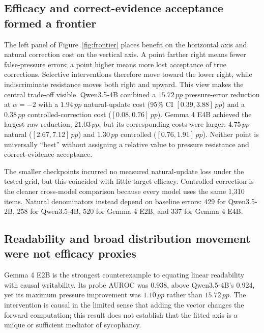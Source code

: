 \documentclass[11pt]{article}
\newcommand{\pp}{\,pp}
\begin{document}
\subsection{Efficacy and correct-evidence acceptance formed a frontier}
\label{sec:selectivity-results}

\begingroup
\let\paperoriginalfigure\figure
\let\paperoriginalendfigure\endfigure
\renewenvironment{figure}[1][]{\paperoriginalfigure[H]}{\paperoriginalendfigure}

\endgroup

The left panel of Figure~\ref{fig:frontier} places benefit on the horizontal
axis and natural correction cost on the vertical axis. A point farther right
means fewer false-pressure errors; a point higher means more lost acceptance of
true corrections. Selective interventions therefore move toward the lower
right, while indiscriminate resistance moves both right and upward. This view
makes the central trade-off visible.
Qwen3.5-4B combined a $15.72\pp$ pressure-error reduction at $\alpha=-2$ with a
$1.94\pp$ natural-update cost (95\% CI $[0.39,3.88]\pp$) and a $0.38\pp$
controlled-correction cost ($[0.08,0.76]\pp$). Gemma
4 E4B achieved the largest raw reduction, $21.03\pp$, but its corresponding
costs were larger: $4.75\pp$ natural ($[2.67,7.12]\pp$) and $1.30\pp$
controlled ($[0.76,1.91]\pp$). Neither point is
universally ``best'' without assigning a relative value to pressure resistance
and correct-evidence acceptance.

The smaller checkpoints incurred no measured natural-update loss under the tested
grid, but this coincided with little target efficacy. Controlled correction is
the cleaner cross-model comparison because every model uses the same 1,310
items. Natural denominators instead depend on baseline errors: 429 for
Qwen3.5-2B, 258 for Qwen3.5-4B, 520 for Gemma 4 E2B, and 337 for Gemma 4 E4B.

\subsection{Readability and broad distribution movement were not efficacy proxies}
\label{sec:diagnostic-results}

Gemma 4 E2B is the strongest counterexample to equating linear readability
with causal writability. Its probe AUROC was 0.938, above Qwen3.5-4B's 0.924,
yet its maximum pressure improvement was $1.10\pp$ rather than $15.72\pp$.
The intervention is causal in the limited sense that adding the vector changes
the forward computation; this result does not establish that the fitted axis is
a unique or sufficient mediator of sycophancy.
\end{document}
